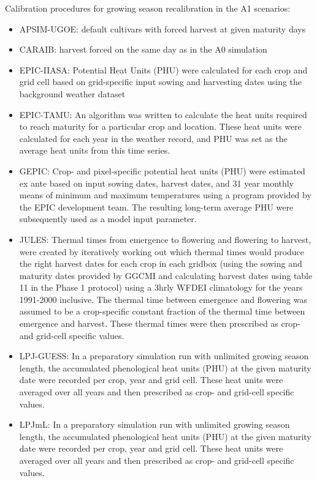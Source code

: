 \documentclass[10pt]{article}
\begin{document}
Calibration procedures for growing season recalibration in the A1 scenarios:
\begin{itemize}
    \item APSIM-UGOE: default cultivars with forced harvest at given maturity days
    \item CARAIB: harvest forced on the same day as in the A0 simulation
    \item EPIC-IIASA: Potential Heat Units (PHU) were calculated for each crop and grid cell based on grid-specific input sowing and harvesting dates using the background weather dataset
    \item EPIC-TAMU: An algorithm was written to calculate the heat units required to reach maturity for a particular crop and location. These heat units were calculated for each year in the weather record, and PHU was set as the average heat units from this time series.
    \item GEPIC: Crop- and pixel-specific potential heat units (PHU) were estimated ex ante based on input sowing dates, harvest dates, and 31 year monthly means of minimum and maximum temperatures using a program provided by the EPIC development team. The resulting long-term average PHU were subsequently used as a model input parameter.
    \item JULES: Thermal times from emergence to flowering and flowering to harvest, were created by iteratively working out which thermal times would produce the right harvest dates for each crop in each gridbox (using the sowing and maturity dates provided by GGCMI and calculating harvest dates using table 11 in the Phase 1 protocol) using a 3hrly WFDEI climatology for the years 1991-2000 inclusive. The thermal time between emergence and flowering was assumed to be a crop-specific constant fraction of the thermal time between emergence and harvest. These thermal times were then prescribed as crop- and grid-cell specific values.
    \item LPJ-GUESS: In a preparatory simulation run with unlimited growing season length, the accumulated phenological heat units (PHU) at the given maturity date were recorded per crop, year and grid cell. These heat units were averaged over all years and then prescribed as crop- and grid-cell specific values.
    \item LPJmL: In a preparatory simulation run with unlimited growing season length, the accumulated phenological heat units (PHU) at the given maturity date were recorded per crop, year and grid cell. These heat units were averaged over all years and then prescribed as crop- and grid-cell specific values.

\end{itemize}
\end{document}
